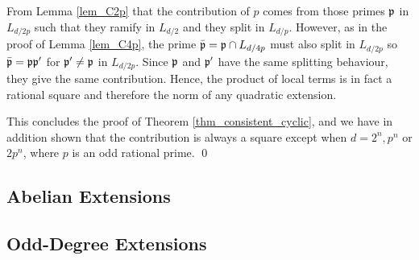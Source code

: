 From Lemma \ref*{lem_C2p} that the contribution of $p$ comes from those primes $\mathfrak{p}$ in $L_{d/2p}$ such that they ramify in $L_{d/2}$ and they split in $L_{d/p}$. However, as in the proof of Lemma \ref*{lem_C4p}, the prime $\bar{\mathfrak{p}}=\mathfrak{p}\cap L_{d/4p}$ must also split in $L_{d/2p}$ so $\bar{\mathfrak{p}}=\mathfrak{p}\mathfrak{p}'$ for $\mathfrak{p}'\neq\mathfrak{p}$ in $L_{d/2p}$. Since $\mathfrak{p}$ and $\mathfrak{p}'$ have the same splitting behaviour, they give the same contribution. Hence, the product of local terms is in fact a rational square and therefore the norm of any quadratic extension.

This concludes the proof of Theorem \ref*{thm_consistent_cyclic}, and we have in addition shown that the contribution is always a square except when $d=2^n,p^n$ or $2p^n$, where $p$ is an odd rational prime.
\qed

\subsection{Abelian Extensions}

\subsection{Odd-Degree Extensions}
